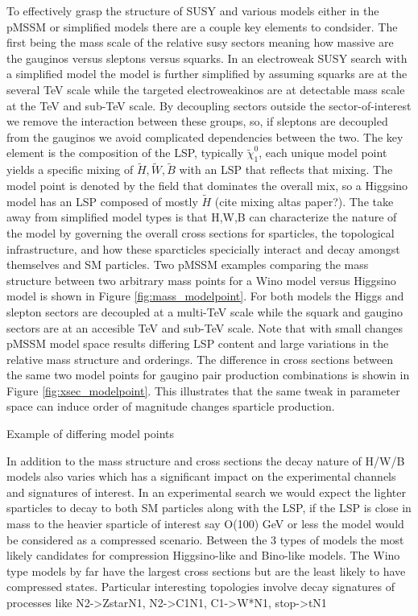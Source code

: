 To effectively grasp the structure of SUSY and various models either in the pMSSM or simplified models there are a couple key elements to condsider. The first being the mass scale of the relative susy sectors meaning how massive are the gauginos versus sleptons versus squarks. In an electroweak SUSY search with a simplified model the model is further simplified by assuming squarks are at the several TeV scale while the targeted electroweakinos are at detectable mass scale at the TeV and sub-TeV scale.  By decoupling sectors outside the sector-of-interest we remove the interaction between these groups, so, if sleptons are decoupled from the gauginos we avoid complicated dependencies between the two. The key element is the composition of the LSP, typically $\tilde{\chi}^0_1$, each unique model point yields a specific mixing of $\tilde{H},\tilde{W},\tilde{B}$ with an LSP that reflects that mixing. The model point is denoted by the field that dominates the overall mix, so a Higgsino model has an LSP composed of mostly $\tilde{H}$ (cite mixing altas paper?). The take away from simplified model types is that H,W,B  can characterize the nature of the model by governing the overall cross sections for sparticles, the topological infrastructure, and how these sparcticles specicially interact and decay amongst themselves and SM particles. Two pMSSM examples comparing the mass structure between two arbitrary mass points for a Wino model versus Higgsino model is shown in Figure \ref{fig:mass_modelpoint}. For both models the Higgs and slepton sectors are decoupled at a multi-TeV scale while the squark and gaugino sectors are at an accesible TeV and sub-TeV scale. Note that with small changes pMSSM model space results differing LSP content and large variations in the relative mass structure and orderings. The difference in cross sections between the same two model points for gaugino pair production combinations is showin in Figure \ref{fig:xsec_modelpoint}. This illustrates that the same tweak in parameter space can induce order of magnitude changes sparticle production.



Example of differing model points


In addition to the mass structure and cross sections the decay nature of H/W/B models also varies which has a significant impact on the experimental channels and signatures of interest. In an experimental search we would expect the lighter sparticles to decay to both SM particles along with the LSP, if the LSP is close in mass to the heavier sparticle of interest say O(100) GeV or less the model would be considered as a compressed scenario. Between the 3 types of models the most likely candidates for compression Higgsino-like and Bino-like models. The Wino type models by far have the largest cross sections but are the least likely to have compressed states. Particular interesting topologies involve decay signatures of processes like N2->ZstarN1, N2->C1N1, C1->W*N1, stop->tN1

